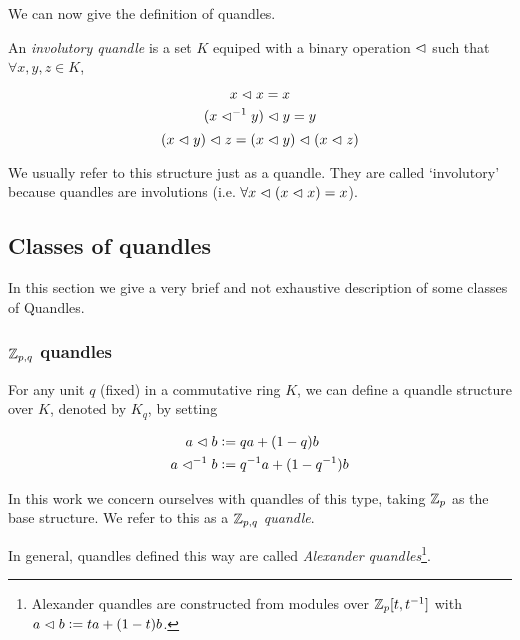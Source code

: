 \documentclass[paper.tex]{subfiles}
\begin{document}
We can now give the definition of quandles.

\begin{definition}
An \emph{involutory quandle} is a set $K$ equiped with a binary operation $\vartriangleleft$ such that $\forall x,y,z \in K$,

\begin{equation}
	x \vartriangleleft x = x
\end{equation}
\begin{equation}
	(x \vartriangleleft^{-1} y) \vartriangleleft y = y \\
\end{equation}
\begin{equation}
  \label{eq:ax3}
	(x \vartriangleleft y) \vartriangleleft z = (x \vartriangleleft y) \vartriangleleft (x \vartriangleleft z) \\
\end{equation}

We usually refer to this structure just as a quandle. They are called `involutory' because quandles are involutions (i.e. $\forall x \vartriangleleft (x \vartriangleleft x) = x$).

\end{definition}

\subsection{Classes of quandles}

In this section we give a very brief and not exhaustive description of some classes of Quandles.

\subsubsection{$\mathbb{Z}_{p,q}$ quandles}
\label{sec:alexander}

For any unit $q$ (fixed) in a commutative ring $K$, we can define a quandle structure over $K$, denoted by $K_q$, by setting

\begin{align}
  a \vartriangleleft b &\vcentcolon= q a + (1 - q)b \\
  a \vartriangleleft^{-1} b &\vcentcolon= q^{-1} a + (1 - q^{-1})b
\end{align}

In this work we concern ourselves with quandles of this type, taking $\mathbb{Z}_p$ as the base structure. We refer to this as a \emph{$\mathbb{Z}_{p,q}$ quandle}.

In general, quandles defined this way are called \emph{Alexander quandles}\footnote{Alexander quandles are constructed from modules over $\mathbb{Z}_p[t,t^{-1}]$ with $a \vartriangleleft b \vcentcolon= t a + (1 - t) b$.}.
\end{document}

